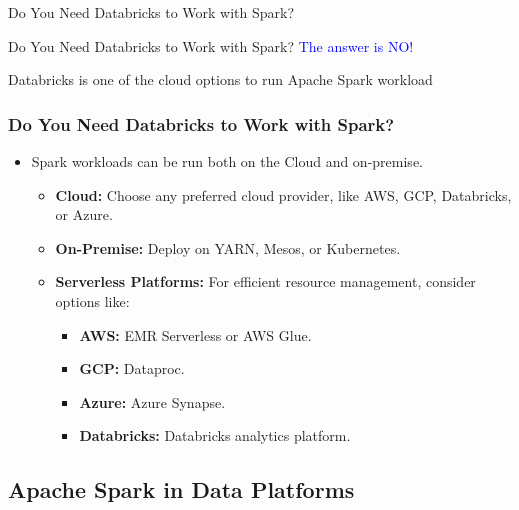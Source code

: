 \begin{frame}
    \centering
    \vfill
    \Large{Do You Need Databricks to Work with Spark?}
    \vspace{1em}
    \vfill
\end{frame}

\begin{frame}
    \centering
    \vfill
    \Large{Do You Need Databricks to Work with Spark?}
    \hspace{1cm}
    \Large{\textcolor{blue}{The answer is NO!}}
    \vfill
\end{frame}
\begin{frame}
    \centering
    \vfill
    \Large{Databricks is one of the cloud options to run Apache Spark workload}
    \hspace{1cm}
    \vfill
\end{frame}
\begin{frame}
    \frametitle{Do You Need Databricks to Work with Spark?}

    \begin{itemize}
        \item Spark workloads can be run both on the Cloud and on-premise.
        \begin{itemize}
            \item \textbf{Cloud:} Choose any preferred cloud provider, like AWS, GCP, Databricks, or Azure.
            \item \textbf{On-Premise:} Deploy on YARN, Mesos, or Kubernetes.
            \item \textbf{Serverless Platforms:} For efficient resource management, consider options like:
            \begin{itemize}
                \item \textbf{AWS:} EMR Serverless or AWS Glue.
                \item \textbf{GCP:} Dataproc.
                \item \textbf{Azure:} Azure Synapse.
                \item \textbf{Databricks:} Databricks analytics platform.
            \end{itemize}
        \end{itemize}
    \end{itemize}
\end{frame}


\subsection{Apache Spark in Data Platforms}\label{subsec:apache-spark-in-data-platforms}

